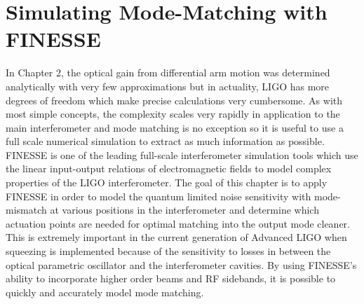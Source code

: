 \chapter{Simulating Mode-Matching with FINESSE}
In Chapter 2, the optical gain from differential arm motion was determined analytically with very few approximations but in actuality, LIGO has more degrees of freedom which make precise calculations very cumbersome.  As with most simple concepts, the complexity scales very rapidly in application to the main interferometer and mode matching is no exception so it is useful to use a full scale numerical simulation to extract as much information as possible.  FINESSE \cite{FinesseManual} \cite{FinesseTechniques} is one of the leading full-scale interferometer simulation tools which use the linear input-output relations of electromagnetic fields to model complex properties of the LIGO interferometer.  The goal of this chapter is to apply FINESSE in order to model the quantum limited noise sensitivity with mode-mismatch at various positions in the interferometer and determine which actuation points are needed for optimal matching into the output mode cleaner.  This is extremely important in the current generation of Advanced LIGO when squeezing is implemented because of the sensitivity to losses in between the optical parametric oscillator and the interferometer cavities.  By using FINESSE's ability to incorporate higher order beams and RF sidebands, it is possible to quickly and accurately model mode matching.


